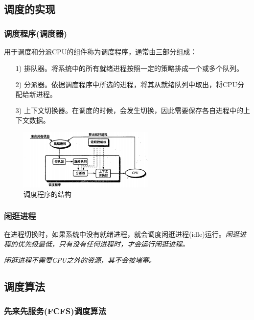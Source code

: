 \subsection{调度的实现}

\subsubsection{调度程序(调度器)}    

    用于调度和分派CPU的组件称为调度程序，通常由三部分组成：

\begin{itemize}
    \item [1)] 排队器。将系统中的所有就绪进程按照一定的策略排成一个或多个队列。
    \item [2)] 分派器。依据调度程序中所选的进程，将其从就绪队列中取出，将CPU分配给新进程。
    \item [3)] 上下文切换器。在调度的时候，会发生切换，因此需要保存各自进程中的上下文数据。
\end{itemize}

\begin{figure}[!htbp]
    \centering
    \includegraphics[width=0.6\textwidth]{image/chapter02/调度程序的结构.png}
    \caption{调度程序的结构}
\end{figure}

\subsubsection{闲逛进程}

    在进程切换时，如果系统中没有就绪进程，就会调度闲逛进程(idle)运行。\emph{闲逛进程的优先级最低，只有没有任何进程时，才会运行闲逛进程。}

    \emph{\color{red}闲逛进程不需要CPU之外的资源，其不会被堵塞。}

\subsection{调度算法}

\subsubsection{先来先服务(FCFS)调度算法}

